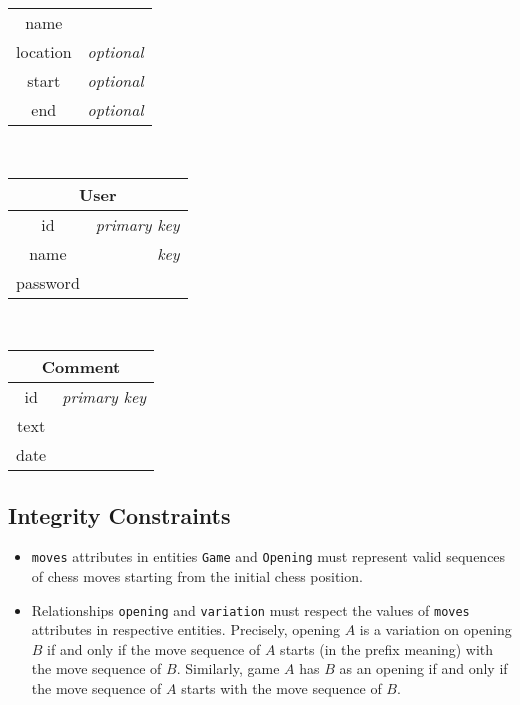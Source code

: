 \documentclass{article}
\begin{document}
\begin{table}[ht!]
\begin{subtable}{3.5cm}
\begin{tabular}[t]{|cr|}
	\hline
	name     &                  \\
	location & \em{optional}    \\
	start    & \em{optional}    \\
	end      & \em{optional}    \\
	\hline
	\end{tabular}
    \end{subtable}
    ~
    \begin{subtable}{3.5cm}
	\begin{tabular}[t]{|cr|}
	\hline
	\multicolumn{2}{|c|}{\textbf{User}} \\
	\hline
	id       & \em{primary key} \\
	name     & \em{key}         \\
	password &                  \\
	\hline
	\end{tabular}
    \end{subtable}
    ~
    \begin{subtable}{3.5cm}
	\begin{tabular}[t]{|cr|}
	\hline
	\multicolumn{2}{|c|}{\textbf{Comment}} \\
	\hline
	id     & \em{primary key} \\
	text   &                  \\
	date   &                  \\
	\hline
	\end{tabular}
    \end{subtable}
\end{table}


\subsection{Integrity Constraints}
\begin{itemize}
\item \verb|moves| attributes in entities \verb|Game| and \verb|Opening| must represent
valid sequences of chess moves starting from the initial chess position.

\item Relationships \verb|opening| and \verb|variation| must respect the values of \verb|moves|
attributes in respective entities.
Precisely, opening $A$ is a variation on opening $B$ if and only if the move sequence
of $A$ starts (in the prefix meaning) with the move sequence of $B$.
Similarly, game $A$ has $B$ as an opening if and only if the move sequence of $A$ starts
with the move sequence of $B$.
\end{itemize}
\end{document}
